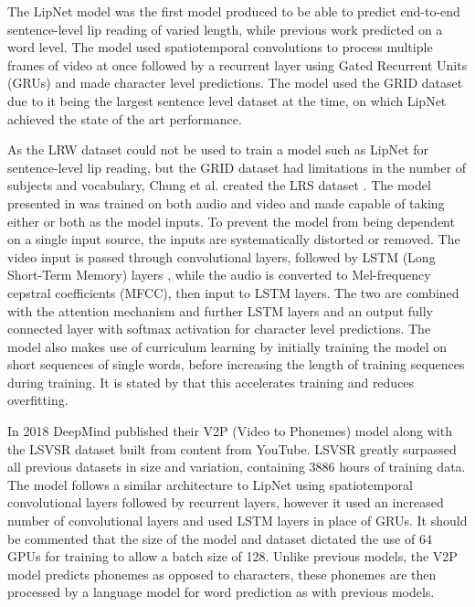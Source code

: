 The LipNet model \cite{Assael2016} was the first model produced to be able to predict end-to-end sentence-level lip reading of varied length, while previous work predicted on a word level.
The model used spatiotemporal convolutions to process multiple frames of video at once followed by a recurrent layer using Gated Recurrent Units (GRUs) \cite{Cho2014} and made character level predictions.
The model used the GRID dataset \cite{Cooke2006} due to it being the largest sentence level dataset at the time, on which LipNet achieved the state of the art performance.

As the LRW dataset could not be used to train a model such as LipNet for sentence-level lip reading, but the GRID dataset had limitations in the number of subjects and vocabulary, Chung et al. created the LRS dataset \cite{Chung2017}.
The model presented in \cite{Chung2017} was trained on both audio and video and made capable of taking either or both as the model inputs.
To prevent the model from being dependent on a single input source, the inputs are systematically distorted or removed.
The video input is passed through convolutional layers, followed by LSTM (Long Short-Term Memory) layers \cite{Cheng2016}, while the audio is converted to Mel-frequency cepstral coefficients (MFCC), then input to LSTM layers.
The two are combined with the attention mechanism and further LSTM layers and an output fully connected layer with softmax activation for character level predictions.
The model also makes use of curriculum learning by initially training the model on short sequences of single words, before increasing the length of training sequences during training.
It is stated by \cite{Chung2017} that this accelerates training and reduces overfitting.

In 2018 DeepMind published their V2P (Video to Phonemes) model \cite{Shillingford2018} along with the LSVSR dataset built from content from YouTube. 
LSVSR greatly surpassed all previous datasets in size and variation, containing 3886 hours of training data.
The model follows a similar architecture to LipNet \cite{Assael2016} using spatiotemporal convolutional layers followed by recurrent layers, however it used an increased number of convolutional layers and used LSTM layers in place of GRUs.
It should be commented that the size of the model and dataset dictated the use of 64 GPUs for training to allow a batch size of 128.
Unlike previous models, the V2P model predicts phonemes as opposed to characters, these phonemes are then processed by a language model for word prediction as with previous models.

